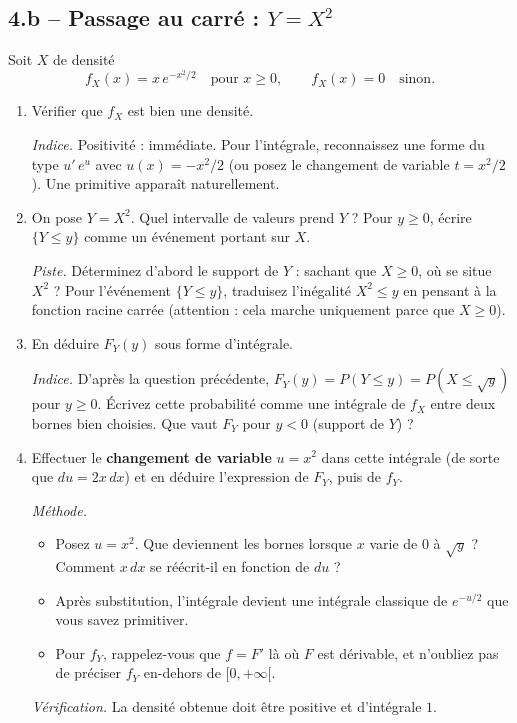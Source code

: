 \subsection*{4.b -- Passage au carré : $Y=X^2$}

Soit $X$ de densité
\[
  f_X(x)=x\,e^{-x^2/2}\quad\text{pour }x\ge 0,\qquad
  f_X(x)=0\quad\text{sinon.}
\]

\begin{enumerate}
  \item Vérifier que $f_X$ est bien une densité.
  \begin{solution}
    \textit{Indice.} Positivité : immédiate. Pour l'intégrale,
    reconnaissez une forme du type $u'\,e^u$ avec $u(x)=-x^2/2$
    (ou posez le changement de variable $t=x^2/2$). Une primitive
    apparaît naturellement.
  \end{solution}

  \item On pose $Y=X^2$. Quel intervalle de valeurs prend $Y$ ?
  Pour $y\ge 0$, écrire $\{Y\le y\}$ comme un événement portant
  sur $X$.
  \begin{solution}
    \textit{Piste.} Déterminez d'abord le support de $Y$ :
    sachant que $X\ge 0$, où se situe $X^2$ ? Pour l'événement
    $\{Y\le y\}$, traduisez l'inégalité $X^2\le y$ en pensant
    à la fonction racine carrée (attention : cela marche
    uniquement parce que $X\ge 0$).
  \end{solution}

  \item En déduire $F_Y(y)$ sous forme d'intégrale.
  \begin{solution}
    \textit{Indice.} D'après la question précédente,
    $F_Y(y)=P(Y\le y)=P(X\le\sqrt{y})$ pour $y\ge 0$. Écrivez cette
    probabilité comme une intégrale de $f_X$ entre deux bornes
    bien choisies. Que vaut $F_Y$ pour $y<0$ (support de $Y$) ?
  \end{solution}

  \item Effectuer le \textbf{changement de variable} $u=x^2$
  dans cette intégrale (de sorte que $du=2x\,dx$) et en déduire
  l'expression de $F_Y$, puis de $f_Y$.
  \begin{solution}
    \textit{Méthode.}
    \begin{itemize}
    \item Posez $u=x^2$. Que deviennent les bornes lorsque $x$ varie
    de $0$ à $\sqrt{y}$ ? Comment $x\,dx$ se réécrit-il en fonction
    de $du$ ?
    \item Après substitution, l'intégrale devient une intégrale
    classique de $e^{-u/2}$ que vous savez primitiver.
    \item Pour $f_Y$, rappelez-vous que $f=F'$ là où $F$ est dérivable,
    et n'oubliez pas de préciser $f_Y$ en-dehors de $[0,+\infty[$.
    \end{itemize}
    \textit{Vérification.} La densité obtenue doit être positive
    et d'intégrale $1$.
  \end{solution}


\end{enumerate}
